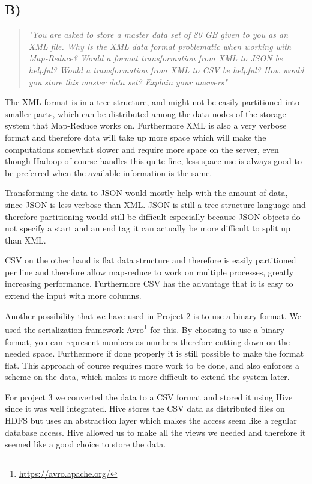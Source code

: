 \subsection{B)}
\begin{quote}
		\textit{"You	are	asked	to	store	a	master	data	set	of	80	GB	given	to	you	as	an	XML	file.	Why	is	the	XML	data	format	problematic	when	working	with	Map-Reduce?	Would	a	format	transformation	from	XML	to	JSON	be	helpful?	Would	a	transformation	from	XML	to	CSV	be	helpful?	How	would	you	store	this	master	data	set?	Explain	your	answers"}
\end{quote}
The XML format is in a tree structure, and might not be easily partitioned into smaller parts, which can be distributed among the data nodes of the storage system that Map-Reduce works on. Furthermore XML is also a very verbose format and therefore data will take up more space which will make the computations somewhat slower and require more space on the server, even though Hadoop of course handles this quite fine, less space use is always good to be preferred when the available information is the same. 

Transforming the data to JSON would mostly help with the amount of data, since JSON is less verbose than XML. JSON is still a tree-structure language and therefore partitioning would still be difficult especially because JSON objects do not specify a start and an end tag it can actually be more difficult to split up than XML. 

CSV on the other hand is flat data structure and therefore is easily partitioned per line and therefore allow map-reduce to work on multiple processes, greatly increasing performance. Furthermore CSV has the advantage that it is easy to extend the input with more columns.

Another possibility that we have used in Project 2 is to use a binary format. We used the serialization framework Avro\footnote{\url{https://avro.apache.org/}} for this. By choosing to use a binary format, you can represent numbers as numbers therefore cutting down on the needed space. Furthermore if done properly it is still possible to make the format flat. This approach of course requires more work to be done, and also enforces a scheme on the data, which makes it more difficult to extend the system later.

\newpar For project 3 we converted the data to a CSV format and stored it using Hive since it was well integrated. Hive stores the CSV data as distributed files on HDFS but uses an abstraction layer which makes the access seem like a regular database access. Hive allowed us to make all the views we needed and therefore it seemed like a good choice to store the data. 

